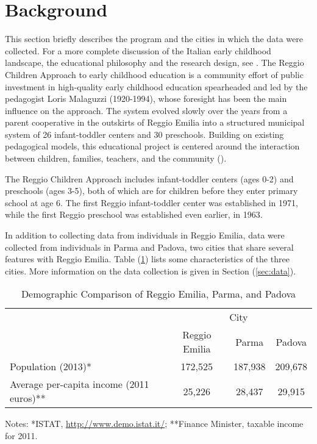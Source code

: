 \section{Background}
\label{sec:background}

This section briefly describes the program and the cities in which the data were collected. For a more complete discussion of the Italian early childhood landscape, the educational philosophy and the research design, see \citet{biroli2015evaluating}. The Reggio Children Approach to early childhood education is a community effort of public investment in high-quality early childhood education spearheaded and led by the pedagogist Loris Malaguzzi (1920-1994), whose foresight has been the main influence on the approach. The system evolved slowly over the years from a parent cooperative in the outskirts of Reggio Emilia into a structured municipal system of 26 infant-toddler centers and 30 preschools. Building on existing pedagogical models, this educational project is centered around the interaction between children, families, teachers, and the community (\cite{Malaguzzi1993}).

The Reggio Children Approach includes infant-toddler centers (ages 0-2) and preschools (ages 3-5), both of which are for children before they enter primary school at age 6. The first Reggio infant-toddler center was established in 1971, while the first Reggio preschool was established even earlier, in 1963. 

In addition to collecting data from individuals in Reggio Emilia, data were collected from individuals in Parma and Padova, two cities that share several features with Reggio Emilia. Table (\ref{tab:comparison}) lists some characteristics of the three cities. More information on the data collection is given in Section (\ref{sec:data}).

\begin{table}[htbp]
\begin{center}
\caption{Demographic Comparison of Reggio Emilia, Parma, and Padova}
\label{tab:comparison}
\begin{tabular}{lccc}
\toprule
& \multicolumn{3}{c}{City} \\
\cmidrule{2-4}
& Reggio Emilia & Parma & Padova \\
\midrule
Population (2013)* & 172,525 &  187,938 & 209,678 \\
Average per-capita income (2011 euros)**  & 25,226 & 28,437 & 29,915 \\
\bottomrule
\end{tabular}
\end{center}
\footnotesize Notes: *ISTAT, \url{http://www.demo.istat.it/}; **Finance Minister, taxable income for 2011.
\end{table}

